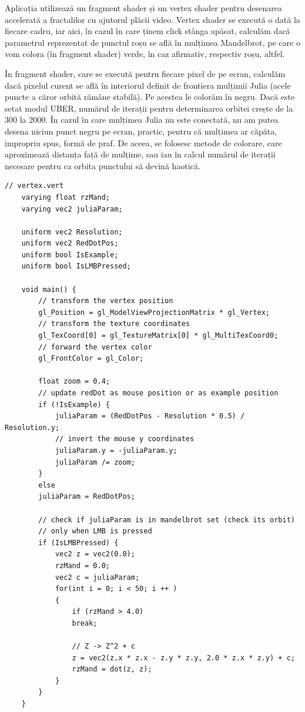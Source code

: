 \documentclass[12pt]{report}
\begin{document}
\newpage
Aplicația utilizează un fragment shader și un vertex shader pentru desenarea accelerată a fractalilor cu ajutorul plăcii video.
Vertex shader se execută o dată la fiecare cadru, iar aici, în cazul în care ținem click stânga apăsat, calculăm dacă parametrul reprezentat de punctul roșu se află în mulțimea Mandelbrot,
pe care o vom colora (în fragment shader) verde, în caz afirmativ, respectiv roșu, altfel.

În fragment shader, care se execută pentru fiecare pixel de pe ecran, calculăm dacă pixelul curent
se află în interiorul definit de frontiera mulțimii Julia (acele puncte a căror orbită rămâne stabilă).
Pe acestea le colorăm în negru. Dacă este setat modul UBER, numărul de iterații pentru determinarea orbitei crește
de la 300 la 2000. În cazul în care mulțimea Julia nu este conectată, nu am putea desena niciun punct negru pe ecran, practic, pentru că
mulțimea ar căpăta, impropriu spus, formă de praf. De aceea, se folosesc metode de colorare, care aproximează distanța față de mulțime,
sau iau în calcul numărul de iterații necesare pentru ca orbita punctului să devină haotică.
\begin{lstlisting}[caption = vertex.vert]
	// vertex.vert	
	varying float rzMand;
	varying vec2 juliaParam;
	
	uniform vec2 Resolution;
	uniform vec2 RedDotPos;
	uniform bool IsExample;
	uniform bool IsLMBPressed;
	
	void main() {
		// transform the vertex position
		gl_Position = gl_ModelViewProjectionMatrix * gl_Vertex;
		// transform the texture coordinates
		gl_TexCoord[0] = gl_TextureMatrix[0] * gl_MultiTexCoord0;
		// forward the vertex color
		gl_FrontColor = gl_Color;
		
		float zoom = 0.4;
		// update redDot as mouse position or as example position
		if (!IsExample) {
			juliaParam = (RedDotPos - Resolution * 0.5) / Resolution.y;
			// invert the mouse y coordinates
			juliaParam.y = -juliaParam.y;
			juliaParam /= zoom;
		}
		else
		juliaParam = RedDotPos;
		
		// check if juliaParam is in mandelbrot set (check its orbit)
		// only when LMB is pressed
		if (IsLMBPressed) {
			vec2 z = vec2(0.0);
			rzMand = 0.0;
			vec2 c = juliaParam;
			for(int i = 0; i < 50; i ++ )
			{
				if (rzMand > 4.0)
				break;
				
				// Z -> Z^2 + c
				z = vec2(z.x * z.x - z.y * z.y, 2.0 * z.x * z.y) + c;
				rzMand = dot(z, z);
			}
		}
	}
	\end{lstlisting}
\end{document}
